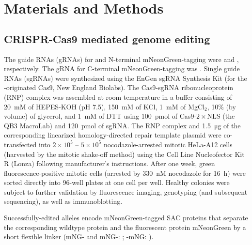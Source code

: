 
\section{Materials and Methods}
\subsection{CRISPR-Cas9 mediated genome editing}
\label{CRISPRMethods}
The guide RNAs (gRNAs) for   and  N-terminal mNeonGreen-tagging were 
and ,
respectively. The gRNA for  
C-terminal mNeonGreen-tagging was .
Single guide RNAs (sgRNAs) were synthesized using the EnGen sgRNA Synthesis Kit (for the -originated Cas9, New England Biolabs). The Cas9-sgRNA ribonucleoprotein (RNP) complex was assembled at room temperature in a buffer consisting of \SI{20}{mM} of HEPES-KOH (pH 7.5), \SI{150}{mM} of KCl, \SI{1}{mM} of MgCl$_2$, 10\% (by volume) of glycerol, and \SI{1}{mM} of DTT using \SI{100}{pmol} of Cas9-$2\times$NLS (the QB3 MacroLab) and \SI{120}{pmol} of sgRNA. The RNP complex and \SI{1.5}{\micro g} of the corresponding linearized homology-directed repair template plasmid were co-transfected into $2\times 10^5$ -- $5\times 10^5$ nocodazole-arrested mitotic HeLa-A12 cells \cite{CRISPRProtocol} (harvested by the mitotic shake-off method) using the Cell Line Nucleofector\texttrademark{} Kit R (Lonza) following manufacturer's instructions. After one week, green fluorescence-positive mitotic cells (arrested by \SI{330}{nM} nocodazole for \SI{16}{h}) were sorted directly into 96-well plates at one cell per well. Healthy colonies were subject to further validation by fluorescence imaging, genotyping (and subsequent sequencing), as well as immunoblotting.

Successfully-edited alleles encode mNeonGreen-tagged SAC proteins that separate the corresponding wildtype protein and the fluorescent protein mNeonGreen by a short flexible linker (mNG- and mNG-: ; -mNG: ).%

